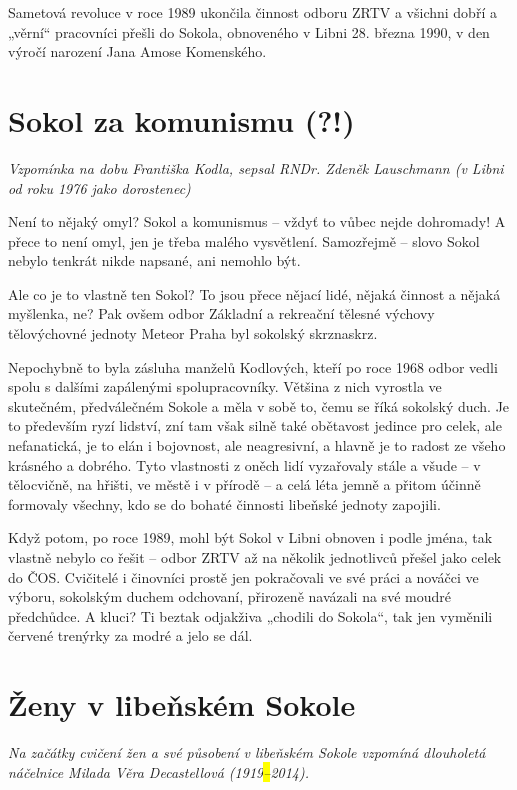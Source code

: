 Sametová revoluce v roce 1989 ukončila činnost odboru ZRTV a všichni
dobří a „věrní`` pracovníci přešli do Sokola, obnoveného v Libni 28.
března 1990, v den výročí narození Jana Amose Komenského.

\section{Sokol za komunismu (?!)}\label{sokol-za-komunismu}

\emph{Vzpomínka na dobu Františka Kodla, sepsal RNDr. Zdeněk Lauschmann
(v Libni od roku 1976 jako dorostenec)}

Není to nějaký omyl? Sokol a komunismus -- vždyť to vůbec nejde
dohromady! A přece to není omyl, jen je třeba malého vysvětlení.
Samozřejmě -- slovo Sokol nebylo tenkrát nikde napsané, ani nemohlo být.

Ale co je to vlastně ten Sokol? To jsou přece nějací lidé, nějaká
činnost a nějaká myšlenka, ne? Pak ovšem odbor Základní a rekreační
tělesné výchovy tělovýchovné jednoty Meteor Praha byl sokolský
skrznaskrz.

Nepochybně to byla zásluha manželů Kodlových, kteří po roce 1968 odbor
vedli spolu s dalšími zapálenými spolupracovníky. Většina z nich
vyrostla ve skutečném, předválečném Sokole a měla v sobě to, čemu se
říká sokolský duch. Je to především ryzí lidství, zní tam však silně
také obětavost jedince pro celek, ale nefanatická, je to elán i
bojovnost, ale neagresivní, a hlavně je to radost ze všeho krásného a
dobrého. Tyto vlastnosti z oněch lidí vyzařovaly stále a všude -- v
tělocvičně, na hřišti, ve městě i v přírodě -- a celá léta jemně a
přitom účinně formovaly všechny, kdo se do bohaté činnosti libeňské
jednoty zapojili.

Když potom, po roce 1989, mohl být Sokol v Libni obnoven i podle jména,
tak vlastně nebylo co řešit -- odbor ZRTV až na několik jednotlivců
přešel jako celek do ČOS. Cvičitelé i činovníci prostě jen pokračovali
ve své práci a nováčci ve výboru, sokolským duchem odchovaní, přirozeně
navázali na své moudré předchůdce. A kluci? Ti beztak odjakživa „chodili
do Sokola``, tak jen vyměnili červené trenýrky za modré a jelo se dál.

\section{Ženy v libeňském
Sokole}\label{ux17eeny-v-libeux148skuxe9m-sokole}

\emph{Na začátky cvičení žen a své působení v libeňském Sokole vzpomíná
dlouholetá náčelnice Milada Věra Decastellová (1919\hl{--}2014).}


